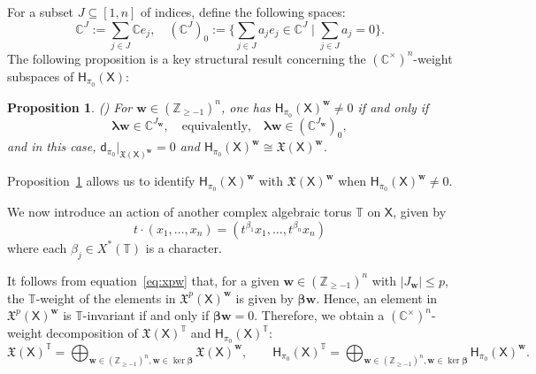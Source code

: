 \documentclass[11pt]{article}
\newcommand{\bbeta}{\boldsymbol{\beta}}
\newcommand{\blambda}{\boldsymbol{\lambda}}
\newcommand{\bw}{\mathbf{w}}
\newtheorem{proposition}[theorem]{Proposition}%
\theoremstyle{definition}\newtheorem{definition}[theorem]{Definition}
\theoremstyle{definition}\newtheorem{remark}[theorem]{Remark}
\theoremstyle{remark}
\numberwithin{equation}{section}
\begin{document}
For a subset $J \subseteq [1,n]$ of indices, define the following spaces:
\begin{equation*}
    \mathbb{C}^J := \sum_{j \in J} \mathbb{C}e_j, \quad (\mathbb{C}^J)_0 := \Big\{ \sum_{j \in J} a_j e_j \in \mathbb{C}^J \mid \sum_{j \in J} a_j = 0\Big\}.
\end{equation*}
The following proposition is a key structural result concerning the $(\mathbb{C}^\times)^n$-weight subspaces of $\mathsf{H}_{\pi_0}(\mathsf{X})$:
\begin{proposition}\label{p:hxw}
    (\cite[Proposition 2.1.5]{lm-deform}) For $\bw \in (\mathbb{Z}_{\geq -1})^n$, one has $\mathsf{H}_{\pi_0}(\mathsf{X})^{\bw} \neq 0$ if and only if
    \begin{equation*}
        \blambda \bw \in \mathbb{C}^{J_{\bw}}, \quad \text{equivalently,} \quad \blambda \bw \in (\mathbb{C}^{J_{\bw}})_0,
    \end{equation*}
    and in this case, $\mathsf{d}_{\pi_0}|_{\mathfrak{X}(\mathsf{X})^{\bw}} = 0$ and $\mathsf{H}_{\pi_0}(\mathsf{X})^{\bw} \cong \mathfrak{X}(\mathsf{X})^{\bw}$.
\end{proposition}
Proposition~\ref{p:hxw} allows us to identify $\mathsf{H}_{\pi_0}(\mathsf{X})^{\bw}$ with $\mathfrak{X}(\mathsf{X})^{\bw}$ when $\mathsf{H}_{\pi_0}(\mathsf{X})^{\bw} \neq 0$.

We now introduce an action of another complex algebraic torus $\mathbb{T}$ on $\mathsf{X}$, given by
\begin{equation*}
    t\cdot (x_1,\ldots,x_n) = (t^{\beta_1}x_1,\ldots,t^{\beta_n}x_n)
\end{equation*}
where each $\beta_j \in X^*(\mathbb{T})$ is a character.

It follows from equation~\eqref{eq:xpw} that, for a given $\bw \in (\mathbb{Z}_{\geq -1})^n$ with $|J_{\bw}|\leq p$, the $\mathbb{T}$-weight of the elements in  $\mathfrak{X}^p(\mathsf{X})^{\bw}$ is given by $\bbeta \bw$. Hence, an element in $\mathfrak{X}^p(\mathsf{X})^{\bw}$ is $\mathbb{T}$-invariant if and only if $\bbeta \bw = 0$. Therefore, we obtain a $(\mathbb{C}^\times)^n$-weight decomposition of $\mathfrak{X}(\mathsf{X})^{\mathbb{T}}$ and $\mathsf{H}_{\pi_0}(\mathsf{X})^{\mathbb{T}}$:
\begin{equation*}
    \mathfrak{X}(\mathsf{X})^{\mathbb{T}} = \bigoplus_{\bw \in (\mathbb{Z}_{\geq -1})^n, \bw \in \ker \bbeta} \mathfrak{X}(\mathsf{X})^{\bw}, \qquad 
    \mathsf{H}_{\pi_0}(\mathsf{X})^{\mathbb{T}} = \bigoplus_{\bw \in (\mathbb{Z}_{\geq -1})^n, \bw \in \ker \bbeta}\mathsf{H}_{\pi_0}(\mathsf{X})^{\bw}.
\end{equation*}
\end{document}
